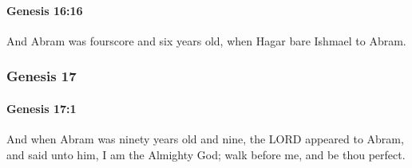 		\paragraph{Genesis 16:16} %
			\label{GENESIS-16-16}

			And Abram was fourscore and six years old, when Hagar bare Ishmael to Abram.

	\subsubsection{Genesis 17} %
		\label{GENESIS-17}

		\paragraph{Genesis 17:1} %
			\label{GENESIS-17-1}

			And when Abram was ninety years old and nine, the LORD appeared to Abram, and said unto him, I am the Almighty God; walk before me, and be thou perfect.

